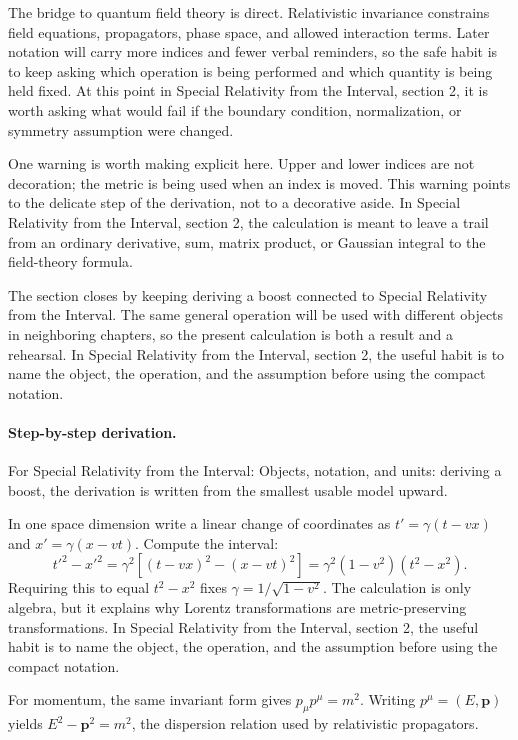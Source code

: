The bridge to quantum field theory is direct.  Relativistic invariance constrains field equations, propagators, phase space, and allowed interaction terms.  Later notation will carry more indices and fewer verbal reminders, so the safe habit is to keep asking which operation is being performed and which quantity is being held fixed.  At this point in Special Relativity from the Interval, section 2, it is worth asking what would fail if the boundary condition, normalization, or symmetry assumption were changed.

One warning is worth making explicit here.  Upper and lower indices are not decoration; the metric is being used when an index is moved.  This warning points to the delicate step of the derivation, not to a decorative aside.  In Special Relativity from the Interval, section 2, the calculation is meant to leave a trail from an ordinary derivative, sum, matrix product, or Gaussian integral to the field-theory formula.

The section closes by keeping deriving a boost connected to Special Relativity from the Interval.  The same general operation will be used with different objects in neighboring chapters, so the present calculation is both a result and a rehearsal.  In Special Relativity from the Interval, section 2, the useful habit is to name the object, the operation, and the assumption before using the compact notation.



\paragraph{Step-by-step derivation.}

For Special Relativity from the Interval: Objects, notation, and units: deriving a boost, the derivation is written from the smallest usable model upward.

In one space dimension write a linear change of coordinates as \(t'=\gamma(t-vx)\) and \(x'=\gamma(x-vt)\).  Compute the interval:
\[
  t'^2-x'^2
  =
  \gamma^2[(t-vx)^2-(x-vt)^2]
  =
  \gamma^2(1-v^2)(t^2-x^2).
\]
Requiring this to equal \(t^2-x^2\) fixes \(\gamma=1/\sqrt{1-v^2}\).  The calculation is only algebra, but it explains why Lorentz transformations are metric-preserving transformations.  In Special Relativity from the Interval, section 2, the useful habit is to name the object, the operation, and the assumption before using the compact notation.

For momentum, the same invariant form gives \(p_\mu p^\mu=m^2\).  Writing \(p^\mu=(E,\bm p)\) yields \(E^2-\bm p^2=m^2\), the dispersion relation used by relativistic propagators.

